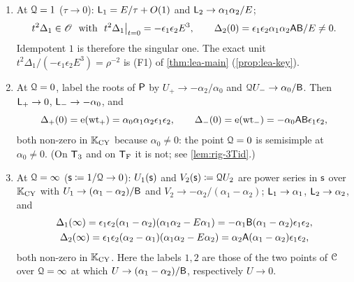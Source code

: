 \begin{lem}[Behaviour at $\cQ=1$, $\cQ=0$, $\cQ=\infty$]
\label{lem:set-limits}
\begin{enumerate}
\item At $\cQ=1$ ($\tau\to0$): $\mathsf{L}_1=E/\tau+O(1)$ and $\mathsf{L}_2\to\alpha_1\alpha_2/E$;
\[
t^2\Delta_1\in\Oan\ \text{ with }\ t^2\Delta_1\big|_{t=0}=-\epsilon_1\epsilon_2E^3,\qquad \Delta_2(0)=\epsilon_1\epsilon_2\alpha_1\alpha_2\wA\wB/E\neq0 .
\]
Idempotent $1$ is therefore the singular one. The exact unit $t^2\Delta_1/(-\epsilon_1\epsilon_2E^3)=\rho^{-2}$ is (F1) of \cref{thm:lea-main} (\cref{prop:lea-key}).
\item At $\cQ=0$, label the roots of $\mathsf{P}$ by $U_+\to-\alpha_2/\alpha_0$ and $\mathcal{Q} U_-\to\alpha_0/\mathsf{B}$. Then $\mathsf{L}_+\to0$, $\mathsf{L}_-\to-\alpha_0$, and
\[
\Delta_+(0)=\mathrm{e}(\mathrm{wt}_+)=\alpha_0\alpha_1\alpha_2\epsilon_1\epsilon_2,\qquad \Delta_-(0)=\mathrm{e}(\mathrm{wt}_-)=-\alpha_0\mathsf{A}\mathsf{B}\epsilon_1\epsilon_2,
\]
both non-zero in $\mathbb{K}_{\mathrm{CY}}$ because $\alpha_0\neq0$: the point $\cQ=0$ is semisimple at $\alpha_0\neq0$. (On $\mathsf{T}_{3}$ and on $\mathsf{T}_{\mathrm{F}}$ it is not; see \cref{lem:rig-3Tid}.)
\item At $\cQ=\infty$ ($\mathsf{s}\coloneqq1/\mathcal{Q}\to0$): $U_1(\mathsf{s})$ and $V_2(\mathsf{s})\coloneqq\mathcal{Q} U_2$ are power series in $\mathsf{s}$ over $\mathbb{K}_{\mathrm{CY}}$ with $U_1\to(\alpha_1-\alpha_2)/\mathsf{B}$ and $V_2\to-\alpha_2/(\alpha_1-\alpha_2)$; $\mathsf{L}_1\to\alpha_1$, $\mathsf{L}_2\to\alpha_2$, and
\begin{equation}
\label{eq:set-Dinf}
\begin{gathered}
\Delta_1(\infty)=\epsilon_1\epsilon_2(\alpha_1-\alpha_2)(\alpha_1\alpha_2-E\alpha_1)=-\alpha_1\mathsf{B}(\alpha_1-\alpha_2)\epsilon_1\epsilon_2,\\
\Delta_2(\infty)=\epsilon_1\epsilon_2(\alpha_2-\alpha_1)(\alpha_1\alpha_2-E\alpha_2)=\alpha_2\mathsf{A}(\alpha_1-\alpha_2)\epsilon_1\epsilon_2,
\end{gathered}
\end{equation}
both non-zero in $\mathbb{K}_{\mathrm{CY}}$. Here the labels $1,2$ are those of the two points of $\mathcal{C}$ over $\cQ=\infty$ at which $U\to(\alpha_1-\alpha_2)/\mathsf{B}$, respectively $U\to0$.
\end{enumerate}
\end{lem}

